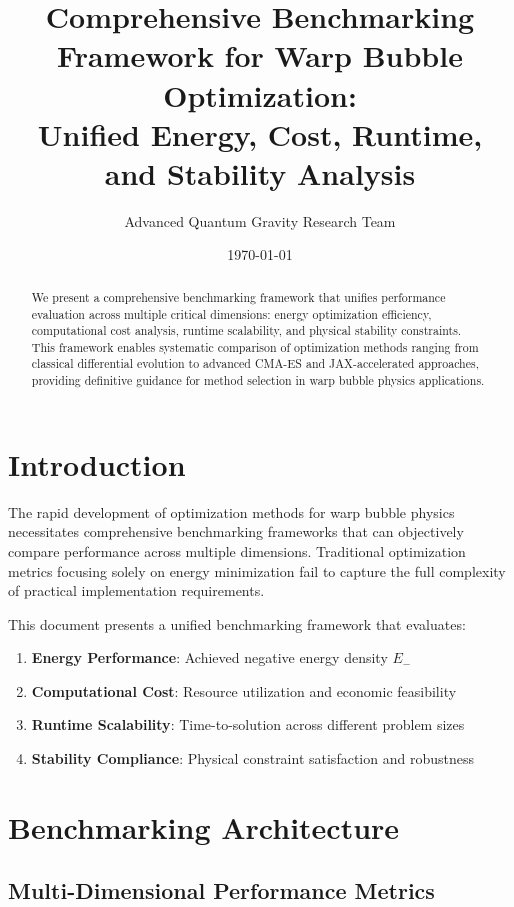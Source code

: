 \documentclass[11pt,a4paper]{article}
\title{Comprehensive Benchmarking Framework for Warp Bubble Optimization:\\
Unified Energy, Cost, Runtime, and Stability Analysis}
\author{Advanced Quantum Gravity Research Team}
\date{\today}
\begin{document}
\maketitle

\begin{abstract}
We present a comprehensive benchmarking framework that unifies performance evaluation across multiple critical dimensions: energy optimization efficiency, computational cost analysis, runtime scalability, and physical stability constraints. This framework enables systematic comparison of optimization methods ranging from classical differential evolution to advanced CMA-ES and JAX-accelerated approaches, providing definitive guidance for method selection in warp bubble physics applications.
\end{abstract}

\section{Introduction}

The rapid development of optimization methods for warp bubble physics necessitates comprehensive benchmarking frameworks that can objectively compare performance across multiple dimensions. Traditional optimization metrics focusing solely on energy minimization fail to capture the full complexity of practical implementation requirements.

This document presents a unified benchmarking framework that evaluates:

\begin{enumerate}
\item \textbf{Energy Performance}: Achieved negative energy density $E_-$
\item \textbf{Computational Cost}: Resource utilization and economic feasibility
\item \textbf{Runtime Scalability}: Time-to-solution across different problem sizes
\item \textbf{Stability Compliance}: Physical constraint satisfaction and robustness
\end{enumerate}

\section{Benchmarking Architecture}

\subsection{Multi-Dimensional Performance Metrics}
\end{document}
